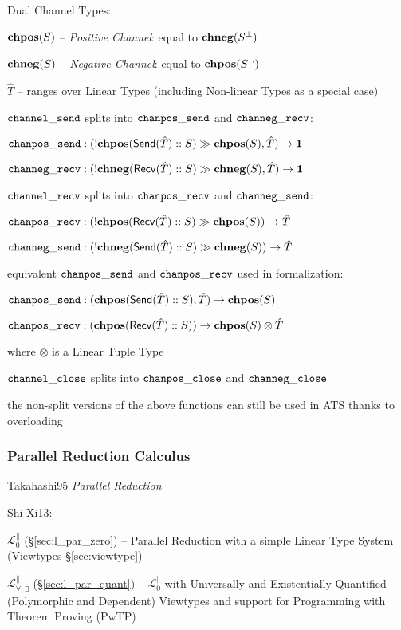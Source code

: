 Dual Channel Types:

$\mathbf{chpos}(S)$ -- \emph{Positive Channel}: equal to $\mathbf{chneg}(S^\bot)$

$\mathbf{chneg}(S)$ -- \emph{Negative Channel}: equal to $\mathbf{chpos}(S^\neg)$

$\hat{T}$ -- ranges over Linear Types (including Non-linear Types as a
special case)

$\mathtt{channel\_send}$ splits into $\mathtt{chanpos\_send}$ and $\mathtt{channeg\_recv}$:

$\mathtt{chanpos\_send} : (!\mathbf{chpos}(\mathsf{Send}(\hat{T})::S) \gg \mathbf{chpos}(S), \hat{T})
\rightarrow \mathsf{\mathbf{1}}$

$\mathtt{channeg\_recv} : (!\mathbf{chneg}(\mathsf{Recv}(\hat{T})::S) \gg \mathbf{chneg}(S), \hat{T})
\rightarrow \mathsf{\mathbf{1}}$

$\mathtt{channel\_recv}$ splits into $\mathtt{chanpos\_recv}$ and $\mathtt{channeg\_send}$:

$\mathtt{chanpos\_recv} : (!\mathbf{chpos}(\mathsf{Recv}(\hat{T})::S) \gg \mathbf{chpos}(S))
\rightarrow \hat{T}$

$\mathtt{channeg\_send} : (!\mathbf{chneg}(\mathsf{Send}(\hat{T})::S) \gg \mathbf{chneg}(S))
\rightarrow \hat{T}$

equivalent $\mathtt{chanpos\_send}$ and $\mathtt{chanpos\_recv}$ used in formalization:

$\mathtt{chanpos\_send} : (\mathbf{chpos}(\mathsf{Send}(\hat{T})::S), \hat{T}) \rightarrow \mathbf{chpos}(S)$

$\mathtt{chanpos\_recv} : (\mathbf{chpos}(\mathsf{Recv}(\hat{T})::S)) \rightarrow \mathbf{chpos}(S)
\otimes \hat{T}$

where $\otimes$ is a Linear Tuple Type

$\mathtt{channel\_close}$ splits into $\mathtt{chanpos\_close}$ and $\mathtt{channeg\_close}$

the non-split versions of the above functions can still be used in ATS
thanks to overloading

\endgroup



\subsubsection{Parallel Reduction Calculus}
\label{sec:parallel_reduction_calculus}


Takahashi95 \emph{Parallel Reduction}

Shi-Xi13:

\fist $\mathcal{L}^\parallel_0$ (\S\ref{sec:l_par_zero}) --
Parallel Reduction with a simple Linear Type System (Viewtypes
\S\ref{sec:viewtype})

\fist $\mathcal{L}^\parallel_{\forall,\exists}$
(\S\ref{sec:l_par_quant}) -- $\mathcal{L}^\parallel_0$ with
Universally and Existentially Quantified (Polymorphic and Dependent)
Viewtypes and support for Programming with Theorem Proving (PwTP)



